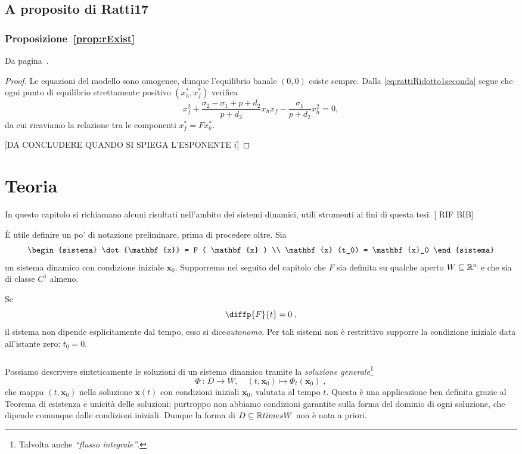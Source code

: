 \section{A proposito di Ratti17}
\subsection{ Proposizione~\ref{prop:rExist} }
Da pagina~\pageref{prop:rExist}.

\begin{proof}
    Le equazioni del modello sono omogenee, dunque l'equilibrio banale $(0,0)$ esiste sempre.
    Dalla \eqref{eq:rattiRidotto1seconda} segue che ogni punto di equilibrio strettamente positivo $(x_h^*, x_f^*)$ verifica
    $$x_f^2 + \frac{\sigma_2 - \sigma_1 + p + d_2}{p +d_2} x_h x_f - \frac{\sigma_1}{p+d_2} x_h^2 = 0,$$
    da cui ricaviamo la relazione tra le componenti $x_f^* = F x_h^*$.

    [DA CONCLUDERE QUANDO SI SPIEGA L'ESPONENTE $i$] %
\end{proof}








\chapter{Teoria}
In questo capitolo si richiamano alcuni risultati nell'ambito dei sistemi dinamici, utili strumenti ai fini
di questa tesi. [ RIF BIB] %

È utile definire un po' di notazione preliminare, prima di procedere oltre.
Sia
$$\begin{sistema}
\dot{\mathbf{x}} = F ( \mathbf{x} ) \\
\mathbf{x} (t_0) = \mathbf{x}_0
\end{sistema}$$
un sistema dinamico con condizione iniziale $\mathbf{x}_0$. Supporremo nel seguito del capitolo che $F$ sia
definita su qualche aperto $W \subseteq \mathbb{R}^n$ e che sia di classe $C^1$ almeno.

Se
$$\diffp{F}{t} = 0 \; ,$$
\ie il sistema non dipende esplicitamente dal tempo, esso si dice\emph{autonomo}.
Per tali sistemi non è restrittivo supporre la condizione iniziale data all'istante zero: $t_0=0$.

\paragraph{}
Possiamo descrivere sinteticamente le soluzioni di un sistema dinamico tramite la
\emph{soluzione generale}\footnote{Talvolta anche \emph{``flusso integrale''}.}
$$\Phi \, : \, D \to W, \quad (t, \mathbf{x}_0 ) \mapsto \Phi_t ( \mathbf{x}_0 ) \; ,$$
che mappa $(t, \mathbf{x}_0 )$ nella soluzione $\mathbf{x} (t)$ con condizioni iniziali $\mathbf{x}_0$,
valutata al tempo $t$. Questa è una applicazione ben definita grazie al Teorema di esistenza e unicità delle
soluzioni; purtroppo non abbiamo condizioni garantite sulla forma del dominio di ogni soluzione, che dipende
comunque dalle condizioni iniziali.
Dunque la forma di $D \subseteq \mathbb{R} times W$ non è nota a priori.

